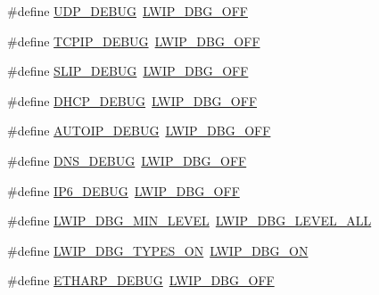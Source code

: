 \begin{DoxyCompactItemize}
\#define \hyperlink{group__lwip__opts__debugmsg_ga0393f312c5475a1c649b39ef9cfcaad4}{U\+D\+P\+\_\+\+D\+E\+B\+UG}~\hyperlink{group__debugging__levels_gadab1cdc3f45939a3a5c9a3d7e04987e1}{L\+W\+I\+P\+\_\+\+D\+B\+G\+\_\+\+O\+FF}
\item 
\#define \hyperlink{group__lwip__opts__debugmsg_ga52d6c83451936c3de3b0338d4a3f921f}{T\+C\+P\+I\+P\+\_\+\+D\+E\+B\+UG}~\hyperlink{group__debugging__levels_gadab1cdc3f45939a3a5c9a3d7e04987e1}{L\+W\+I\+P\+\_\+\+D\+B\+G\+\_\+\+O\+FF}
\item 
\#define \hyperlink{group__lwip__opts__debugmsg_gab986f95183559d8678c6d80969b01857}{S\+L\+I\+P\+\_\+\+D\+E\+B\+UG}~\hyperlink{group__debugging__levels_gadab1cdc3f45939a3a5c9a3d7e04987e1}{L\+W\+I\+P\+\_\+\+D\+B\+G\+\_\+\+O\+FF}
\item 
\#define \hyperlink{group__lwip__opts__debugmsg_ga97927ceecabcdb5f41735bf372a05cee}{D\+H\+C\+P\+\_\+\+D\+E\+B\+UG}~\hyperlink{group__debugging__levels_gadab1cdc3f45939a3a5c9a3d7e04987e1}{L\+W\+I\+P\+\_\+\+D\+B\+G\+\_\+\+O\+FF}
\item 
\#define \hyperlink{group__lwip__opts__debugmsg_gafaee522e7f32d81022215e1805e303a5}{A\+U\+T\+O\+I\+P\+\_\+\+D\+E\+B\+UG}~\hyperlink{group__debugging__levels_gadab1cdc3f45939a3a5c9a3d7e04987e1}{L\+W\+I\+P\+\_\+\+D\+B\+G\+\_\+\+O\+FF}
\item 
\#define \hyperlink{group__lwip__opts__debugmsg_gaba55da2352c99d813767913e5e36be1f}{D\+N\+S\+\_\+\+D\+E\+B\+UG}~\hyperlink{group__debugging__levels_gadab1cdc3f45939a3a5c9a3d7e04987e1}{L\+W\+I\+P\+\_\+\+D\+B\+G\+\_\+\+O\+FF}
\item 
\#define \hyperlink{group__lwip__opts__debugmsg_gac2f9726756b78d4d7c425b0422a776ce}{I\+P6\+\_\+\+D\+E\+B\+UG}~\hyperlink{group__debugging__levels_gadab1cdc3f45939a3a5c9a3d7e04987e1}{L\+W\+I\+P\+\_\+\+D\+B\+G\+\_\+\+O\+FF}
\item 
\#define \hyperlink{group__lwip__opts__debugmsg_ga2043f599515774f8e571ba185dbcb9e7}{L\+W\+I\+P\+\_\+\+D\+B\+G\+\_\+\+M\+I\+N\+\_\+\+L\+E\+V\+EL}~\hyperlink{group__debugging__levels_ga8ebaeb006b43f55897f3196b3617dc87}{L\+W\+I\+P\+\_\+\+D\+B\+G\+\_\+\+L\+E\+V\+E\+L\+\_\+\+A\+LL}
\item 
\#define \hyperlink{group__lwip__opts__debugmsg_gac095d0e53f5eb5b326b2cccfd071d93d}{L\+W\+I\+P\+\_\+\+D\+B\+G\+\_\+\+T\+Y\+P\+E\+S\+\_\+\+ON}~\hyperlink{group__debugging__levels_ga9e31b7cbbc8f46af8e62b548079acd4e}{L\+W\+I\+P\+\_\+\+D\+B\+G\+\_\+\+ON}
\item 
\#define \hyperlink{group__lwip__opts__debugmsg_gabff5d1e0b334f5b45bd2b8bbb675411e}{E\+T\+H\+A\+R\+P\+\_\+\+D\+E\+B\+UG}~\hyperlink{group__debugging__levels_gadab1cdc3f45939a3a5c9a3d7e04987e1}{L\+W\+I\+P\+\_\+\+D\+B\+G\+\_\+\+O\+FF}

\end{DoxyCompactItemize}
